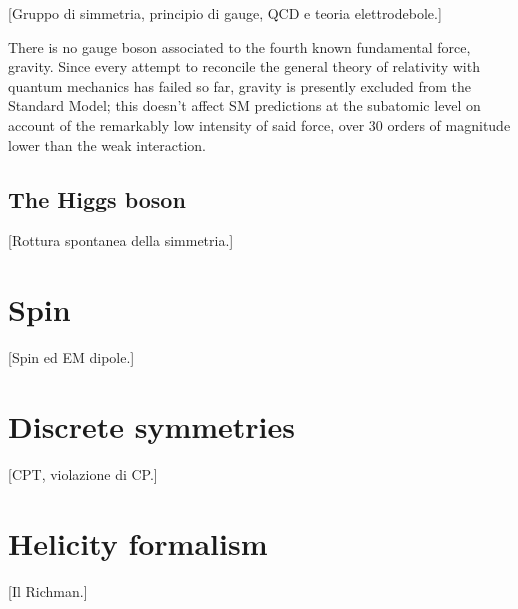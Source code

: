 [Gruppo di simmetria, principio di gauge, QCD e teoria elettrodebole.]

There is no gauge boson associated to the fourth known fundamental force, gravity.
Since every attempt to reconcile the general theory of relativity with quantum mechanics has failed so far, gravity is presently excluded from the Standard Model; this doesn't affect SM predictions at the subatomic level on account of the remarkably low intensity of said force, over 30 orders of magnitude lower than the weak interaction.

\subsection{The Higgs boson}
[Rottura spontanea della simmetria.]

\section{Spin}
[Spin ed EM dipole.]

\section{Discrete symmetries}
[CPT, violazione di CP.]

\section{Helicity formalism}
[Il Richman.]